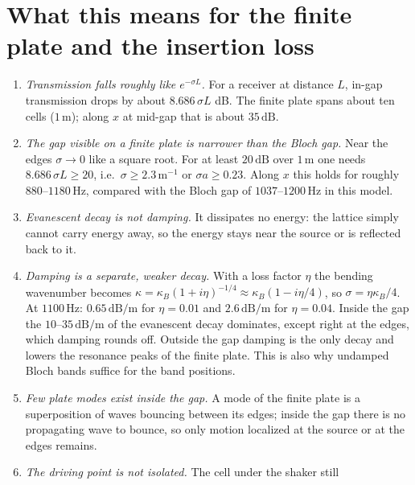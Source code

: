 \section{What this means for the finite plate and the insertion loss}

\begin{enumerate}
  \item \emph{Transmission falls roughly like $e^{-\sigma L}$.} For a receiver at
        distance $L$, in-gap transmission drops by about $8.686\,\sigma L$ dB. The
        finite plate spans about ten cells ($1\,\mathrm{m}$); along $x$ at mid-gap that
        is about $35\,\mathrm{dB}$.
  \item \emph{The gap visible on a finite plate is narrower than the Bloch gap.} Near
        the edges $\sigma \to 0$ like a square root. For at least $20\,\mathrm{dB}$ over
        $1\,\mathrm{m}$ one needs $8.686\,\sigma L \ge 20$, i.e.\ $\sigma \ge
        2.3\,\mathrm{m}^{-1}$ or $\sigma a \ge 0.23$. Along $x$ this holds for roughly
        $880$--$1180\,\mathrm{Hz}$, compared with the Bloch gap of
        $1037$--$1200\,\mathrm{Hz}$ in this model.
  \item \emph{Evanescent decay is not damping.} It dissipates no energy: the lattice
        simply cannot carry energy away, so the energy stays near the source or is
        reflected back to it.
  \item \emph{Damping is a separate, weaker decay.} With a loss factor $\eta$ the
        bending wavenumber becomes $\kappa = \kappa_B(1 + i\eta)^{-1/4} \approx
        \kappa_B(1 - i\eta/4)$, so $\sigma = \eta\kappa_B/4$. At $1100\,\mathrm{Hz}$:
        $0.65\,\mathrm{dB/m}$ for $\eta = 0.01$ and $2.6\,\mathrm{dB/m}$ for
        $\eta = 0.04$. Inside the gap the $10$--$35\,\mathrm{dB/m}$ of the evanescent
        decay dominates, except right at the edges, which damping rounds off. Outside
        the gap damping is the only decay and lowers the resonance peaks of the finite
        plate. This is also why undamped Bloch bands suffice for the band positions.
  \item \emph{Few plate modes exist inside the gap.} A mode of the finite plate is a
        superposition of waves bouncing between its edges; inside the gap there is no
        propagating wave to bounce, so only motion localized at the source or at the
        edges remains.
  \item \emph{The driving point is not isolated.} The cell under the shaker still

\end{enumerate}
